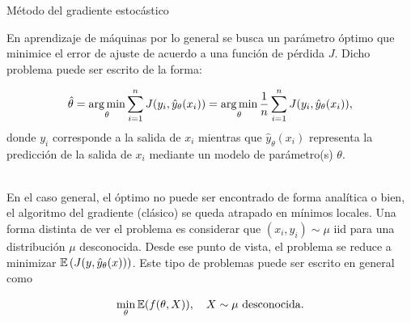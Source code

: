\documentclass[handout, 9pt]{beamer}
\begin{document}
\begin{frame}{Método del gradiente estocástico}


En aprendizaje de máquinas por lo general se busca un parámetro óptimo que minimice el error de ajuste de acuerdo a una función de pérdida $J$. Dicho problema puede ser escrito de la forma: \pause
  
  \begin{equation*}
    \hat{\theta} = \operatorname*{arg\,min}_\theta \sum_{i=1}^n J(y_i,\hat{y}_\theta(x_i)) = \operatorname*{arg\,min}_\theta \frac{1}{n} \sum_{i=1}^n J(y_i,\hat{y}_\theta(x_i)),
  \end{equation*} \pause 
  donde $y_i$ corresponde a la salida de $x_i$ mientras que $\hat{y}_\theta(x_i)$ representa la predicción de la salida de $x_i$ mediante un modelo de parámetro(s) $\theta$.\\~\
  
En el caso general, el óptimo no puede ser encontrado de forma analítica o bien, el algoritmo del gradiente (clásico) se queda atrapado en mínimos locales. Una forma distinta de ver el problema es considerar que $(x_i,y_i)\sim\mu$ iid para una distribución $\mu$ desconocida. Desde ese punto de vista, el problema se reduce a minimizar $\operatorname{\mathbb{E}}\left(J(y,\hat{y}_\theta(x))\right)$. Este tipo de problemas puede ser escrito en general como \pause 
  
  \begin{equation*}
    \min_\theta \operatorname{\mathbb{E}}(f(\theta,X)),\quad X\sim \mu\text{ desconocida}.
  \end{equation*} 




\end{frame}
\end{document}
